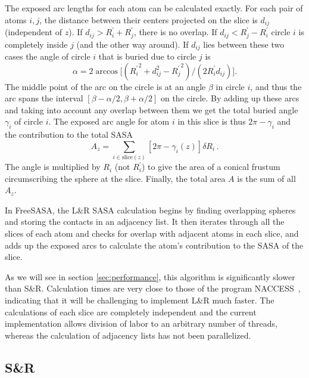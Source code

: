 \documentclass[a4paper,11pt]{article}
\begin{document}
The exposed arc lengths for each atom can be calculated exactly. For
each pair of atoms $i,j$, the distance between their centers projected
on the slice is $d_{ij}$ (independent of $z$). If $d_{ij} > R_i^\prime
+ R_j^\prime$, there is no overlap. If $d_{ij} < R_j^\prime -
R_i^\prime$ circle $i$ is completely inside $j$ (and the other way
around). If $d_{ij}$ lies between these two cases the angle of circle
$i$ that is buried due to circle $j$ is 
\begin{equation}
  \alpha = 2\arccos
  \bigl[({R_i^\prime}^2_{\,} + d_{ij}^2 - {R_{j}^\prime}^2_{\,})/(2R_i^\prime
  d_{ij})\bigr].
\end{equation}
The middle point of the arc on the circle is at an angle $\beta$ in
circle $i$, and thus the arc spans the interval
$[\beta-\alpha/2,\beta+\alpha/2]$ on the circle. By adding up these
arcs and taking into account any overlap between them we get the total
buried angle $\gamma_i$ of circle $i$. The exposed arc angle for atom
$i$ in this slice is thus $2\pi-\gamma_i$ and the contribution to the
total SASA
\begin{equation}\label{eq:LR_SASA}
  A_z =\!\!  \sum_{i \in \text{slice}(z)} \!\! 
    \left[2\pi-\gamma_i(z)\right]\delta R_i\,.
\end{equation}
The angle is multiplied by $R_i$ (not $R_i^\prime$) to give the area
of a conical frustum circumscribing the sphere at the slice. Finally,
the total area $A$ is the sum of all $A_z$.

In FreeSASA, the L\&R SASA calculation begins by finding overlapping
spheres and storing the contacts in an adjacency list. It then
iterates through all the slices of each atom and checks for overlap
with adjacent atoms in each slice, and adds up the exposed arcs to
calculate the atom's contribution to the SASA of the slice.

As we will see in section \ref{sec:performance}, this algorithm is
significantly slower than S\&R. Calculation times are very close to
those of the program NACCESS~\cite{NACCESS}, indicating that it will
be challenging to implement L\&R much faster. The calculations of each
slice are completely independent and the current implementation allows
division of labor to an arbitrary number of threads, whereas the
calculation of adjacency lists has not been parallelized.

\subsection{S\&R}
\end{document}
